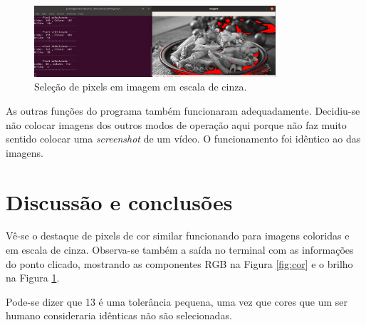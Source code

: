 \documentclass{bmvc2k}
\begin{document}
\begin{figure}[htpb]
\begin{center}
\includegraphics[width=0.8\textwidth]{Figs/img1.png}
\end{center}
   \caption{Seleção de pixels em imagem em escala de cinza.}
   \label{fig:gray}
\end{figure}

As outras funções do programa também funcionaram adequadamente. Decidiu-se não colocar imagens dos outros modos de operação aqui porque não faz muito sentido colocar uma \textit{screenshot} de um vídeo. O funcionamento foi idêntico ao das imagens. 

\section{Discussão e conclusões}
\label{sec:concl}

Vê-se o destaque de pixels de cor similar funcionando para imagens coloridas e em escala de cinza. Observa-se também a saída no terminal com as informações do ponto clicado, mostrando as componentes RGB na Figura \ref{fig:cor} e o brilho na Figura \ref{fig:gray}.

Pode-se dizer que 13 é uma tolerância pequena, uma vez que cores que um ser humano consideraria idênticas não são selecionadas.



\end{document}

